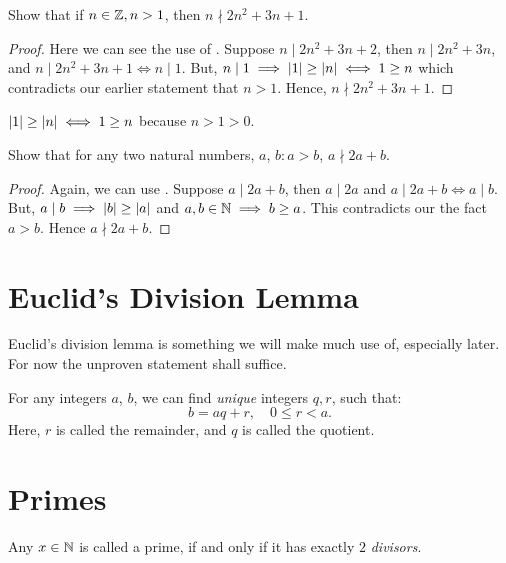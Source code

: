 \begin{example}
	Show that if \(n \in \mathbb Z, n > 1\), then \(n \nmid 2n^2 + 3n + 1\).
	\begin{proof}
		Here we can see the use of . Suppose \(n \mid 2n^2+3n+2\), then \(n \mid 2n^2 + 3n\), and \(n \mid 2n^2 + 3n + 1 \iff n \mid 1\). But, \( n \mid 1 \implies \abs{1} \ge \abs{n} \iff 1 \ge n\) which contradicts our earlier statement that \(n > 1\). Hence, \(n \nmid 2n^2+3n+1\).
	\end{proof}
	
	
\end{example}

\begin{remark}
	\( \abs{1} \ge \abs{n} \iff 1 \ge n\) because \(n>1>0\).
\end{remark}


\begin{example}
	Show that for any two natural numbers, \(a\), \(b : a > b\), \(a \nmid 2a+b\).
	
	\begin{proof}
		Again, we can use . Suppose \(a \mid 2a+b\), then \(a \mid 2a\) and \(a \mid 2a + b \iff a \mid b\). But, \(a \mid b \implies \abs{b} \ge \abs{a} \) and \(a, b \in \mathbb N \implies b \ge a \). This contradicts our the fact \(a > b\). Hence \(a \nmid 2a+b\).
	\end{proof}
\end{example}

\section{Euclid's Division Lemma}

Euclid's division lemma is something we will make much use of, especially later. For now the unproven statement shall suffice.

\begin{theorem}
	\label{thm: euclid}
	For any integers \(a\), \(b\), we can find \textit{unique} integers \(q, r\), such that: \[b=aq + r, \quad 0 \le r <a. \]
	Here, \(r\) is called the remainder, and \(q\) is called the quotient.
\end{theorem}

\section{Primes}


\begin{definition}
	[Primes]
	Any \(x \in \mathbb N\) is called a prime, if and only if it has exactly \(2\) \textit{divisors}.
\end{definition}

